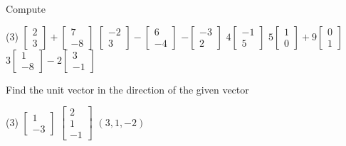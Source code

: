 \begin{exercise}
\pagebreak[2]
Compute
\begin{tasks}(3)
\task
$\begin{bmatrix}
2 \\
3 
\end{bmatrix}
+
\begin{bmatrix}
7 \\
-8
\end{bmatrix}
$
\task
$\begin{bmatrix}
-2 \\
3 
\end{bmatrix}
-
\begin{bmatrix}
6 \\
-4
\end{bmatrix}
$
\task
$
-\begin{bmatrix}
-3 \\
2 
\end{bmatrix}
$
\task
$
4\begin{bmatrix}
-1 \\
5 
\end{bmatrix}
$
\task
$
5\begin{bmatrix}
1 \\
0 
\end{bmatrix}
+
9
\begin{bmatrix}
0 \\
1
\end{bmatrix}
$
\task
$
3\begin{bmatrix}
1 \\
-8 
\end{bmatrix}
-
2
\begin{bmatrix}
3 \\
-1
\end{bmatrix}
$
\end{tasks}
\end{exercise}

\begin{exercise}
Find the unit vector in the direction of the given vector
\begin{tasks}(3)
\task
$\begin{bmatrix}
1 \\
-3 
\end{bmatrix}
$
\task
$\begin{bmatrix}
2 \\
1 \\
-1
\end{bmatrix}
$
\task
$(3,1,-2)$
\end{tasks}
\end{exercise}

